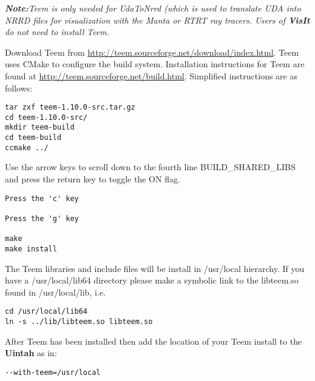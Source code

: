 \documentclass[11pt,fleqn]{book} %
\begin{document}
\label{subsec:teem}

\emph{ \textbf{Note:}Teem is only needed for UdaToNrrd (which is used to
  translate UDA into NRRD files for visualization with the Manta or
  RTRT ray tracers.  Users of \textbf{\emph{VisIt}} do not need to install Teem.}

Download Teem from
\url{http://teem.sourceforge.net/download/index.html}.  Teem uses
CMake to configure the build system. Installation instructions for
Teem are found at \url{http://teem.sourceforge.net/build.html}.
Simplified instructions are as follows:

\begin{lstlisting}
tar zxf teem-1.10.0-src.tar.gz
cd teem-1.10.0-src/
mkdir teem-build
cd teem-build
ccmake ../
\end{lstlisting}

Use the arrow keys to scroll down to the fourth line
BUILD\_SHARED\_LIBS and press the return key to toggle the ON flag.

\begin{lstlisting}
Press the 'c' key

Press the 'g' key

make
make install
\end{lstlisting}
The Teem libraries and include files will be install in /usr/local
hierarchy.  If you have a /usr/local/lib64 directory please make a
symbolic link to the libteem.so found in /usr/local/lib, i.e.

\begin{lstlisting}
cd /usr/local/lib64
ln -s ../lib/libteem.so libteem.so
\end{lstlisting}

After Teem has been installed then add the location of your Teem
install to the \textbf{Uintah} as in:

\begin{lstlisting}
--with-teem=/usr/local
\end{lstlisting}

  
\end{document}
